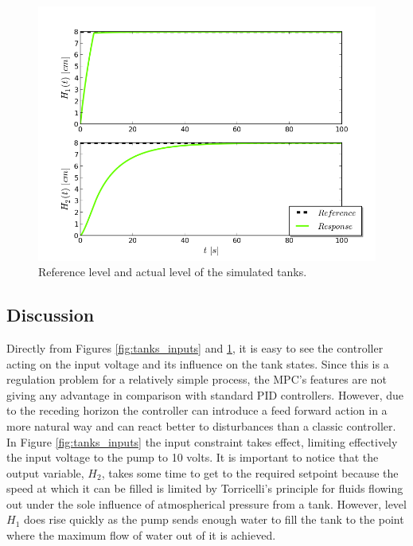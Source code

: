 \begin{figure}[H]
\centeringState
\includegraphics[scale=0.7]{Images/Chapter5/tank_system/levels_control.png}
\caption{Reference level and actual level of the simulated tanks.}
\label{fig:tanks_states}
\end{figure}

\subsection{Discussion}

Directly from Figures \ref{fig:tanks_inputs} and \ref{fig:tanks_states}, it is easy to see the controller acting on the input voltage and its influence on the tank states. Since this is a regulation problem for a relatively simple process, the MPC's features are not giving any advantage in comparison with standard PID controllers. However, due to the receding horizon the controller can introduce a feed forward action in a more natural way and can react better to disturbances than a classic controller. In Figure \ref{fig:tanks_inputs} the input constraint takes effect, limiting effectively the input voltage to the pump to 10 volts. It is important to notice that the output variable, $H_2$, takes some time to get to the required setpoint because the speed at which it can be filled is limited by Torricelli's principle for fluids flowing out under the sole influence of atmospherical pressure from a tank. However, level $H_1$ does rise quickly as the pump sends enough water to fill the tank to the point where the maximum flow of water out of it is achieved. 


